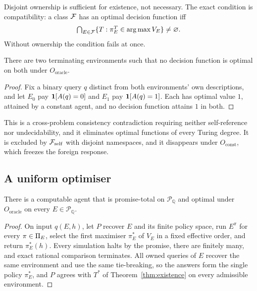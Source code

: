 Disjoint ownership is sufficient for existence, not necessary. The exact condition is compatibility:
a class $\mathcal{F}$ has an optimal decision function iff
\[
  \textstyle\bigcap_{E\in\mathcal{F}}\{T:\pi^T_E\in\operatorname*{arg\,max} V_E\}\neq\varnothing .
\]
Without ownership the condition fails at once.

\begin{proposition}\label{prop:foreign}
There are two terminating environments such that no decision function is optimal on both under
$O_{\mathrm{oracle}}$.
\end{proposition}

\begin{proof}
Fix a binary query $q$ distinct from both environments' own descriptions, and let $E_0$ pay
$\mathbf{1}[A(q)=0]$ and $E_1$ pay $\mathbf{1}[A(q)=1]$. Each has optimal value $1$, attained by a constant agent,
and no decision function attains $1$ in both.
\end{proof}

This is a cross-problem consistency contradiction requiring neither self-reference nor
undecidability, and it eliminates optimal functions of every Turing degree. It is excluded by
$\mathcal{F}_{\mathrm{self}}$ with disjoint namespaces, and it disappears under $O_{\mathrm{const}}$, which
freezes the foreign response.

\subsection{A uniform optimiser}

\begin{theorem}\label{thm:promiseopt}
There is a computable agent that is promise-total on $\mathcal P_{\mathbb Q}$ and optimal under
$O_{\mathrm{oracle}}$ on every $E\in\mathcal P_{\mathbb Q}$.
\end{theorem}

\begin{proof}
On input $q(E,h)$, let $P$ recover $E$ and its finite policy space, run $E^\pi$ for every
$\pi\in\Pi_E$, select the first maximiser $\pi^*_E$ of $V_E$ in a fixed effective order, and return
$\pi^*_E(h)$. Every simulation halts by the promise, there are finitely many, and exact rational
comparison terminates. All owned queries of $E$ recover the same environment and use the same
tie-breaking, so the answers form the single policy $\pi^*_E$, and $P$ agrees with $T^*$ of
Theorem~\ref{thm:existence} on every admissible environment.
\end{proof}

